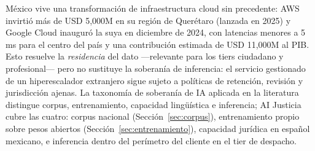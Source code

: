 México vive una transformación de infraestructura cloud sin precedente: AWS invirtió más de USD 5,000M en su región de Querétaro (lanzada en 2025)\cite{aws2024} y Google Cloud inauguró la suya en diciembre de 2024, con latencias menores a 5 ms para el centro del país y una contribución estimada de USD 11,000M al PIB.\cite{gcp2024} Esto resuelve la \emph{residencia} del dato ---relevante para los tiers ciudadano y profesional--- pero no sustituye la soberanía de inferencia: el servicio gestionado de un hiperescalador extranjero sigue sujeto a políticas de retención, revisión y jurisdicción ajenas. La taxonomía de soberanía de IA aplicada en la literatura distingue corpus, entrenamiento, capacidad lingüística e inferencia;\cite{alia2026} AI Justicia cubre las cuatro: corpus nacional (Sección~\ref{sec:corpus}), entrenamiento propio sobre pesos abiertos (Sección~\ref{sec:entrenamiento}), capacidad jurídica en español mexicano, e inferencia dentro del perímetro del cliente en el tier de despacho.
